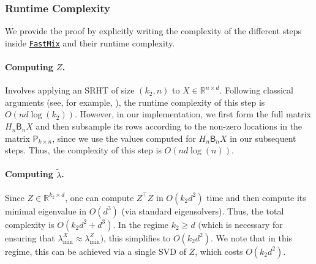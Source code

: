 \documentclass[11pt]{article}
\theoremstyle{definition}
\theoremstyle{plain}
\newcommand{\reals}{\mathbb{R}}
\newcommand{\FastMix}{\hyperref[alg:fast_mixing]{\texttt{FastMix}}\xspace}
\begin{document}
\subsubsection{Runtime Complexity}  
    We provide the proof by explicitly writing the complexity of the different steps inside \FastMix and their runtime complexity. 

    \paragraph{Computing $Z$.} 
    Involves applying an SRHT of size $(k_2, n)$ to $X\in \reals^{n\times d}$. Following classical arguments (see, for example, \citet{ailon2009fast}), the runtime complexity of this step is $O(nd\log(k_2))$. However, in our implementation, we first form the full matrix $H_n\mathsf{B}_nX$ and then subsample its rows according to the non-zero locations in the matrix $\mathsf{P}_{k\times n}$, since we use the values computed for $H_n\mathsf{B}_nX$ in our subsequent steps. Thus, the complexity of this step is $O(nd\log(n))$. 

    \paragraph{Computing $\widetilde{\lambda}$.} 
    Since $Z\in\reals^{k_2\times d}$, one can compute $Z^{\top}Z$ in $O(k_2d^2)$ time and then compute its minimal eigenvalue in $O(d^3)$ (via standard eigensolvers). Thus, the total complexity is $O(k_2d^2 + d^3)$. In the regime $k_2 \ge d$ $\big($which is necessary for ensuring that $\lambda_{\min}^{X} \approx \lambda_{\min}^{Z}$$\big)$, this simplifies to $O(k_2d^2)$. We note that in this regime, this can be achieved via a single SVD of $Z$, which costs $O(k_2 d^2)$.
\end{document}
